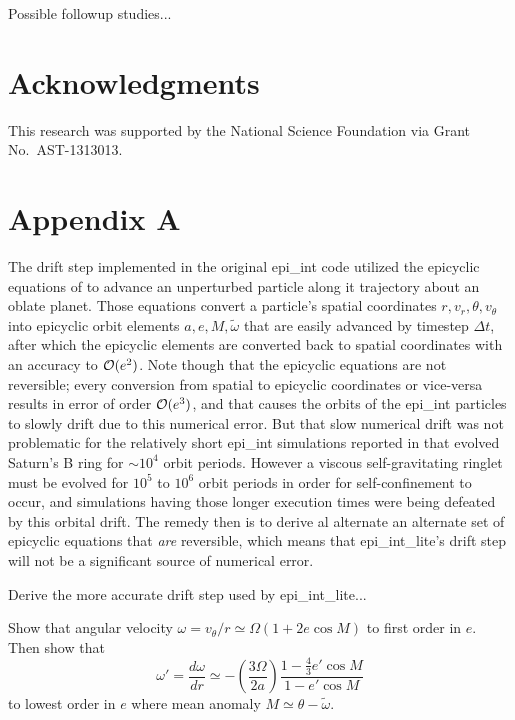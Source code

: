 \documentclass[preprint]{aastex62}
\begin{document}
Possible followup studies...

\acknowledgments
\section{Acknowledgments}
\label{sec:Acknowledgments}

This research was supported by the National Science Foundation via Grant No.\ AST-1313013.


\appendix

\section{Appendix A}
\label{sec:Appendix A}

The drift step implemented in the original epi\_int code utilized the epicyclic equations of \cite{BL94}
to advance an unperturbed particle along it trajectory about an oblate planet. Those equations
convert a particle's spatial coordinates $r, v_r, \theta, v_\theta$
into epicyclic orbit elements $a,e,M,\tilde{\omega}$ that are easily advanced by timestep
$\Delta t$, after which the epicyclic elements are converted back to spatial coordinates
with an accuracy to ${\cal O}(e^2)$. Note though that the epicyclic equations are not reversible;
every conversion from spatial to epicyclic coordinates or vice-versa results in error of order ${\cal O}(e^3)$,
and that causes the orbits of the epi\_int particles to slowly drift due to this numerical error. 
But that slow numerical drift
was not problematic for the relatively short epi\_int simulations reported in \cite{HS13} that evolved
Saturn's B ring for $\sim10^4$ orbit periods. However a viscous self-gravitating
ringlet must be evolved for $10^5$ to $10^6$ orbit periods in order for self-confinement to occur,
and simulations having those longer execution times were being defeated by this orbital drift. 
The remedy then is to derive al alternate an alternate set of epicyclic equations that
{\em are} reversible, which means that epi\_int\_lite's drift step will not be a significant
source of numerical error.

Derive the more accurate drift step used by epi\_int\_lite...

Show that angular velocity $\omega=v_\theta/r\simeq\Omega(1+2e\cos M)$ to
first order in $e$. Then show that
\begin{equation}
    \label{eqn:domega-dr}
    \omega' = \frac{d\omega}{dr} \simeq -\left(\frac{3\Omega}{2a}\right)
        \frac{1-\frac{4}{3}e'\cos M}{1-e'\cos M}
\end{equation}
to lowest order in $e$ where mean anomaly $M\simeq\theta-\tilde{\omega}$.
\end{document}
